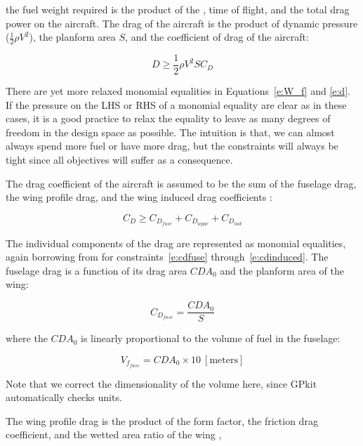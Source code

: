 the fuel weight required is the product of the \BSFC, time of flight, and the
total drag power on the aircraft.
The drag of the aircraft is the product of dynamic pressure ($\frac{1}{2} \rho V^2$),
the planform area $S$, and the coefficient of drag of the aircraft:

\begin{equation}
    D \geq \frac{1}{2} \rho V^2 S C_D
    \label{e:d}
\end{equation}

There are yet more relaxed monomial equalities in Equations~\ref{e:W_f} and \ref{e:d}.
If the pressure on the \gls{LHS} or \gls{RHS} of a monomial equality are clear as in these cases,
it is a good practice to relax the equality to leave as many degrees of freedom
in the design space as possible. The intuition is that, we can almost always spend more fuel or have more drag,
but the constraints will always be tight since all objectives will suffer as a consequence.

The drag coefficient of the aircraft is assumed to be the sum of the fuselage drag,
the wing profile drag, and the wing induced drag coefficients \cite{gp_ac_design}:

\begin{equation}
    C_D \geq C_{D_{fuse}} + C_{D_{wpar}} + C_{D_{ind}}
\label{e:cd}
\end{equation}

The individual components of the drag are represented as monomial equalities, again borrowing
from \cite{gp_ac_design} for constraints~\ref{e:cdfuse} through~\ref{e:cdinduced}.
The fuselage drag is a function of its drag area $CDA_0$ and the planform area of the wing:

\begin{equation}
    C_{D_{fuse}} = \frac{CDA_0}{S}
\label{e:cdfuse}
\end{equation}

where the $CDA_0$ is linearly proportional to the volume of fuel in the fuselage:

\begin{equation}
    V_{f_{fuse}} = CDA_0 \times 10 ~\mathrm{[meters]}
\label{e:vffuse}
\end{equation}

Note that we correct the dimensionality of the volume here, since GPkit automatically checks units.

The wing profile drag is the product of the form factor, the friction drag coefficient,
and the wetted area ratio of the wing \cite{gp_ac_design},

